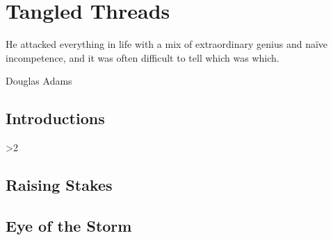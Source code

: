 \documentclass[a4paper,openany]{book}
\begin{document}
%

\glsunsetall


\printglossary[
  style=topicmcols,
]

\printglossary[
  type=mech,
  style=topicmcols,
  nonumberlist,
  ]

\printglossary[
  type=symbols,
  ]

\mainmatter




\glsresetall
\clearpage


\chapter{Tangled Threads}
  \epigraph{He attacked everything in life with a mix of extraordinary genius and na\"ive incompetence, and it was often difficult to tell which was which.}{Douglas Adams}

\section{Introductions}
\begin{multicols}{2}
\ifnum\value{cycle}>2
  
  
  
  
\else
  
  
  
  
\fi
\end{multicols}

\section{Raising Stakes}
\begin{multicols}{2}



\end{multicols}

\section{Eye of the Storm}

\begin{multicols}{2}


\end{multicols}
\end{document}
